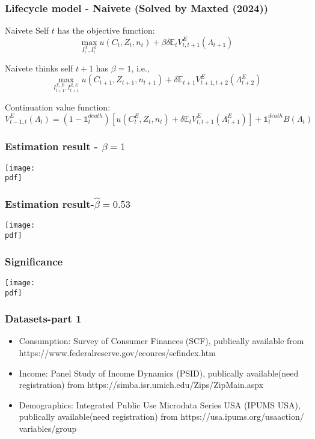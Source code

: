 \documentclass[11pt,xcolor={dvipsnames},hyperref={pdftex,pdfpagemode=UseNone,hidelinks,pdfdisplaydoctitle=true},usepdftitle=false]{beamer}
\newcommand{\pdf}{figures.pdf}
\begin{document}
\begin{frame}
\frametitle{Lifecycle model - Naivete (Solved by Maxted (2024))}
Naivete Self $t$ has the objective function:
$$
\max_{I_t^X, I_t^Z} u(C_t,Z_t, n_t) + \beta\delta \mathbb{E}_t V_{t,t+1}^E (\Lambda_{t+1})
$$

Naivete thinks self $t+1$ has $\beta=1$, i.e.,
$$
\max_{I_{t+1}^{X,E}, I_{t+1}^{Z,E}} u(C_{t+1}, Z_{t+1}, n_{t+1}) + \delta \mathbb{E}_{t+1} V_{t+1, t+2}^E \left(\Lambda_{t+2}^E\right)
$$

Continuation value function:
$$
V_{t-1, t}^E (\Lambda_t) = (1-\mathbb{1}_t^{death})[u(C_t^E, Z_t, n_t) + \delta \mathbb{E}_t V_{t,t+1}^E (\Lambda_{t+1}^E)] + \mathbb{1}_t^{death} B(\Lambda_t)
$$

\end{frame}

\begin{frame}
\end{frame}


\begin{frame}
\frametitle{Estimation result - $\beta=1$}
\texttt{[image: \\pdf]}%

\end{frame}

\begin{frame}
\frametitle{Estimation result-$\hat \beta = 0.53$}
\texttt{[image: \\pdf]}%
\end{frame}

\begin{frame}
\frametitle{Significance}
\texttt{[image: \\pdf]}%
\end{frame}

\begin{frame}
\end{frame}

\begin{frame}
\frametitle{Datasets-part 1}

\begin{itemize}
\item Consumption: Survey of Consumer Finances (SCF), publically available from https://www.federalreserve.gov/econres/scfindex.htm
\item Income: Panel Study of Income Dynamics (PSID), publically available(need registration) from https://simba.isr.umich.edu/Zips/ZipMain.aspx
\item Demographics: Integrated Public Use Microdata Series USA (IPUMS USA), publically available(need registration) from https://usa.ipums.org/usaaction/
variables/group

\end{itemize}
\end{frame}
\end{document}
